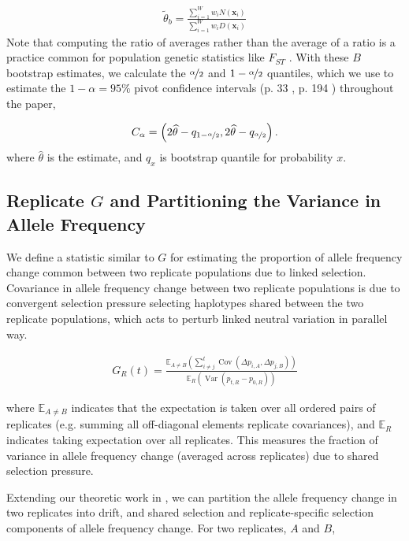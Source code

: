 \documentclass[11pt]{article}
\newcommand{\E}{\mathbb{E}}
\DeclareMathOperator{\var}{Var}
\DeclareMathOperator{\cov}{Cov}
\begin{document}
\begin{align}
  \tilde{\theta}_b = \frac{\sum_{i=1}^W w_i N(\mathbf{x}_i)}{\sum_{i=1}^W w_i D(\mathbf{x}_i)}
\end{align}
%
Note that computing the ratio of averages rather than the average of a ratio is
a practice common for population genetic statistics like $F_{ST}$
\parencite{Bhatia2013-zy}. With these $B$ bootstrap estimates, we calculate the
$\nicefrac{\alpha}{2}$ and $1-\nicefrac{\alpha}{2}$ quantiles, which we use to
estimate the $1-\alpha = 95\%$ pivot confidence intervals (p. 33
\cite{Wasserman2006-jl}, p. 194 \cite{Davison2013-oy}) throughout the paper,

\begin{align}
  C_\alpha = \left(2 \widehat{\theta} - q_{1-\nicefrac{\alpha}{2}}, 2 \widehat{\theta} - q_{\nicefrac{\alpha}{2}} \right).
\end{align}
%
where $\widehat{\theta}$ is the estimate, and $q_x$ is bootstrap quantile for
probability $x$.

\subsection{Replicate $G$ and Partitioning the Variance in Allele Frequency}
\label{supp:replicate-g}

We define a statistic similar to $G$ for estimating the proportion of allele
frequency change common between two replicate populations due to linked
selection. Covariance in allele frequency change between two replicate
populations is due to convergent selection pressure selecting haplotypes shared
between the two replicate populations, which acts to perturb linked neutral
variation in parallel way. 

\begin{align}
  G_R(t) = \frac{\E_{A \ne B}(\sum_{i\ne j}^t \cov(\Delta p_{i,A}, \Delta p_{j,B}))}{\E_R(\var(p_{t,R} - p_{0,R}))}
\end{align}

where $\E_{A \ne B}$ indicates that the expectation is taken over all ordered
pairs of replicates (e.g. summing all off-diagonal elements replicate
covariances), and $\E_R$ indicates taking expectation over all replicates. This
measures the fraction of variance in allele frequency change (averaged across
replicates) due to shared selection pressure.

Extending our theoretic work in \textcite{Buffalo2019-io}, we can partition the
allele frequency change in two replicates into drift, and shared selection and
replicate-specific selection components of allele frequency change. For two
replicates, $A$ and $B$, 
\end{document}
